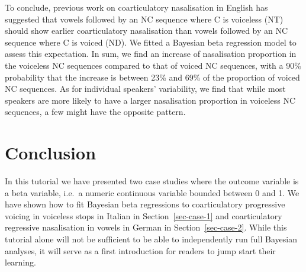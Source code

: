 \documentclass[
  authoryear,
  preprint,
  3p]{elsarticle}
\begin{document}
\textcolor[HTML]{b22222}{To conclude, previous work on coarticulatory
nasalisation in English has suggested that vowels followed by an NC
sequence where C is voiceless (NT) should show earlier coarticulatory
nasalisation than vowels followed by an NC sequence where C is voiced
(ND). We fitted a Bayesian beta regression model to assess this
expectation. In sum, we find an increase of nasalisation proportion in
the voiceless NC sequences compared to that of voiced NC sequences, with
a 90\% probability that the increase is between 23\% and 69\% of the
proportion of voiced NC sequences. As for individual speakers'
variability, we find that while most speakers are more likely to have a
larger nasalisation proportion in voiceless NC sequences, a few might
have the opposite pattern.}

\section{Conclusion}\label{conclusion}

In this tutorial we have presented two case studies where the outcome
variable is a beta variable, i.e.~a numeric continuous variable bounded
between 0 and 1. We have shown how to fit Bayesian beta regressions to
coarticulatory progressive voicing in voiceless stops in Italian in
Section~\ref{sec-case-1} and coarticulatory regressive nasalisation in
vowels in German in Section~\ref{sec-case-2}. While this tutorial alone
will not be sufficient to be able to independently run full Bayesian
analyses, it will serve as a first introduction for readers to jump
start their learning.



\end{document}
